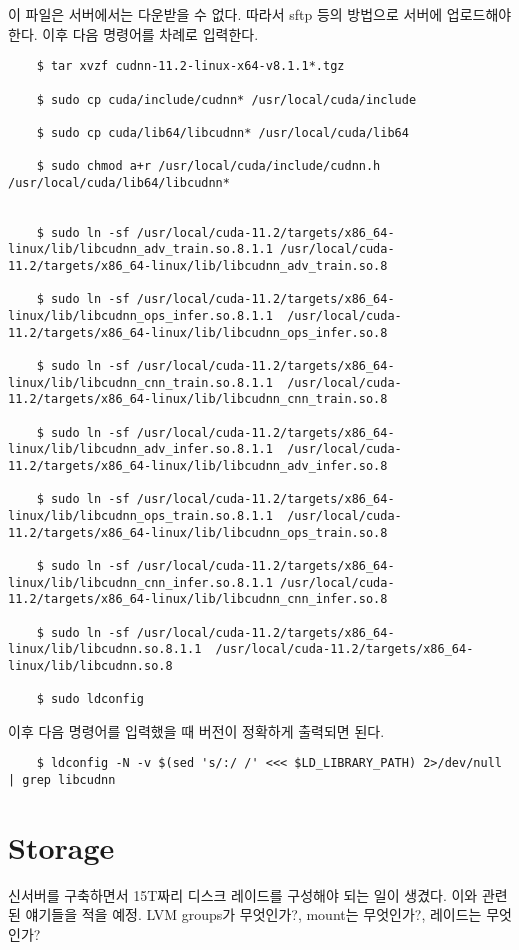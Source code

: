 이 파일은 서버에서는 다운받을 수 없다. 따라서 sftp 등의 방법으로 서버에 업로드해야 한다. 이후 다음 명령어를 차례로 입력한다.
\begin{lstlisting}
    $ tar xvzf cudnn-11.2-linux-x64-v8.1.1*.tgz

    $ sudo cp cuda/include/cudnn* /usr/local/cuda/include

    $ sudo cp cuda/lib64/libcudnn* /usr/local/cuda/lib64

    $ sudo chmod a+r /usr/local/cuda/include/cudnn.h /usr/local/cuda/lib64/libcudnn*


    $ sudo ln -sf /usr/local/cuda-11.2/targets/x86_64-linux/lib/libcudnn_adv_train.so.8.1.1 /usr/local/cuda-11.2/targets/x86_64-linux/lib/libcudnn_adv_train.so.8

    $ sudo ln -sf /usr/local/cuda-11.2/targets/x86_64-linux/lib/libcudnn_ops_infer.so.8.1.1  /usr/local/cuda-11.2/targets/x86_64-linux/lib/libcudnn_ops_infer.so.8

    $ sudo ln -sf /usr/local/cuda-11.2/targets/x86_64-linux/lib/libcudnn_cnn_train.so.8.1.1  /usr/local/cuda-11.2/targets/x86_64-linux/lib/libcudnn_cnn_train.so.8

    $ sudo ln -sf /usr/local/cuda-11.2/targets/x86_64-linux/lib/libcudnn_adv_infer.so.8.1.1  /usr/local/cuda-11.2/targets/x86_64-linux/lib/libcudnn_adv_infer.so.8

    $ sudo ln -sf /usr/local/cuda-11.2/targets/x86_64-linux/lib/libcudnn_ops_train.so.8.1.1  /usr/local/cuda-11.2/targets/x86_64-linux/lib/libcudnn_ops_train.so.8

    $ sudo ln -sf /usr/local/cuda-11.2/targets/x86_64-linux/lib/libcudnn_cnn_infer.so.8.1.1 /usr/local/cuda-11.2/targets/x86_64-linux/lib/libcudnn_cnn_infer.so.8

    $ sudo ln -sf /usr/local/cuda-11.2/targets/x86_64-linux/lib/libcudnn.so.8.1.1  /usr/local/cuda-11.2/targets/x86_64-linux/lib/libcudnn.so.8

    $ sudo ldconfig
\end{lstlisting}
이후 다음 명령어를 입력했을 때 버전이 정확하게 출력되면 된다.
\begin{lstlisting}
    $ ldconfig -N -v $(sed 's/:/ /' <<< $LD_LIBRARY_PATH) 2>/dev/null | grep libcudnn
\end{lstlisting}
\section{Storage}
신서버를 구축하면서 15T짜리 디스크 레이드를 구성해야 되는 일이 생겼다. 이와 관련된 얘기들을 적을 예정. LVM groups가 무엇인가?, mount는 무엇인가?, 레이드는 무엇인가? 

